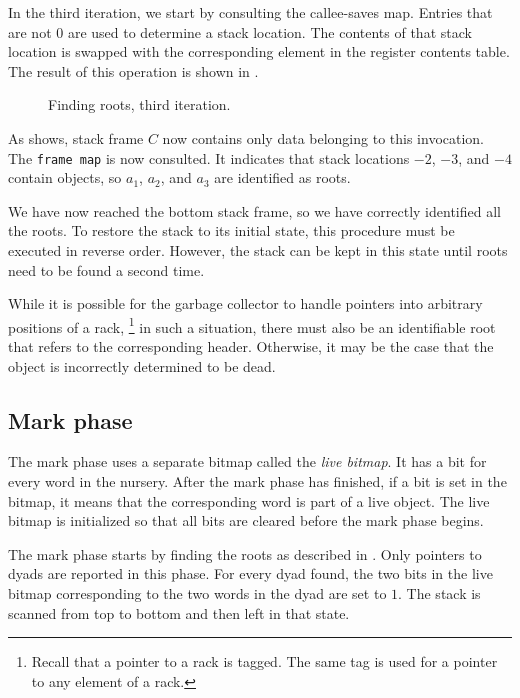 In the third iteration, we start by consulting the callee-saves map.
Entries that are not $0$ are used to determine a stack location.  The
contents of that stack location is swapped with the corresponding
element in the register contents table.  The result of this operation
is shown in .

\begin{figure}
\begin{center}
\end{center}
\caption{\label{fig-root-finding-example-3b}
Finding roots, third iteration.}
\end{figure}

As  shows, stack frame $C$ now
contains only data belonging to this invocation.  The \texttt{frame
  map} is now consulted.  It indicates that stack locations $-2$,
$-3$, and $-4$ contain \commonlisp{} objects, so $a_1$, $a_2$, and
$a_3$ are identified as roots.

We have now reached the bottom stack frame, so we have correctly
identified all the roots.  To restore the stack to its initial state,
this procedure must be executed in reverse order.  However, the stack
can be kept in this state until roots need to be found a second time.

While it is possible for the garbage collector to handle pointers into
arbitrary positions of a rack,%
\footnote{Recall that a pointer to a rack is tagged.  The same tag is
  used for a pointer to any element of a rack.}
in such a situation, there must also be an identifiable root that
refers to the corresponding header.  Otherwise, it may be the case
that the object is incorrectly determined to be dead.

\subsection{Mark phase}

The mark phase uses a separate bitmap called the \emph{live bitmap}.
It has a bit for every word in the nursery.  After the mark phase has
finished, if a bit is set in the bitmap, it means that the
corresponding word is part of a live object.  The live bitmap is
initialized so that all bits are cleared before the mark phase begins.

The mark phase starts by finding the roots as described in
.  Only pointers to dyads
are reported in this phase.  For every dyad found, the two bits in the
live bitmap corresponding to the two words in the dyad are set to $1$.
The stack is scanned from top to bottom and then left in that state.

